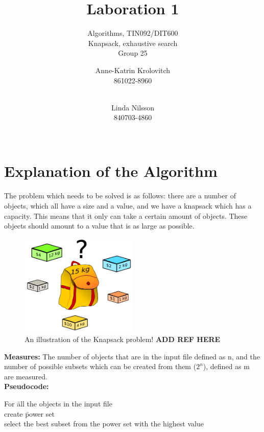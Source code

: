 \documentclass{inc/mas}
\title{Laboration 1 }
\subtitle{Algorithms, TIN092/DIT600\\ Knapsack, exhaustive search \\ Group 25}
\affiliation{}
\begin{document}
\author{Anne-Katrin Krolovitch \\ 861022-8960\\ \\ \and
Linda Nilsson \\ 840703-4860 \\ \\ \tabularnewline
}
\maketitle
\section{Explanation of the Algorithm} 
 \noindent The problem which needs to be solved is as follows: there are a number of objects, which all have a size and a value, and we have a knapsack which has a capacity. This means that it only can take a certain amount of objects. These objects should amount to a value that is as large as possible.\\

\begin{figure}[h!]
  \centering
      \includegraphics[width=0.5\textwidth]{Knapsack.png}
  \caption{An illustration of the Knapsack problem! \textbf{ADD REF HERE} }
\end{figure}



\textbf{Measures:} The number of objects that are in the input file defined as n, and the number of possible subsets which can be created from them ($2^n$), defined as m are measured.\\

\noindent \textbf{Pseudocode:}
\begin{tabbing}
For \= all the objects in the input file \\
\> create \= power set	\\
\> select the best subset from the power set with the highest value\\
\end{tabbing}
\end{document}
